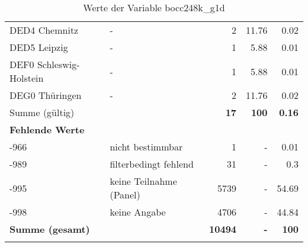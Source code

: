 \begin{longtable}{Xlrrr}
     \multicolumn{1}{X}{DED4 Chemnitz} &
     - &
     \num{2} &
     \num[round-mode=places,round-precision=2]{11.76} &
     \num[round-mode=places,round-precision=2]{0.02} \\

     \multicolumn{1}{X}{DED5 Leipzig} &
     - &
     \num{1} &
     \num[round-mode=places,round-precision=2]{5.88} &
     \num[round-mode=places,round-precision=2]{0.01} \\

     \multicolumn{1}{X}{DEF0 Schleswig-Holstein} &
     - &
     \num{1} &
     \num[round-mode=places,round-precision=2]{5.88} &
     \num[round-mode=places,round-precision=2]{0.01} \\

     \multicolumn{1}{X}{DEG0 Thüringen} &
     - &
     \num{2} &
     \num[round-mode=places,round-precision=2]{11.76} &
     \num[round-mode=places,round-precision=2]{0.02} \\
     \midrule
      \multicolumn{2}{l}{Summe (gültig)} & \textbf{\num{17}} &
      \textbf{\num{100}} &
         \textbf{\num[round-mode=places,round-precision=2]{0.16}} \\
     \multicolumn{5}{l}{\textbf{Fehlende Werte}}\\
       -966 & nicht bestimmbar & \num{1} & - & \num[round-mode=places,round-precision=2]{0.01} \\

       -989 & filterbedingt fehlend & \num{31} & - & \num[round-mode=places,round-precision=2]{0.3} \\

       -995 & keine Teilnahme (Panel) & \num{5739} & - & \num[round-mode=places,round-precision=2]{54.69} \\

       -998 & keine Angabe & \num{4706} & - & \num[round-mode=places,round-precision=2]{44.84} \\

     \midrule
     \multicolumn{2}{l}{\textbf{Summe (gesamt)}} & \textbf{\num{10494}} & \textbf{-} & \textbf{\num{100}} \\
     \bottomrule
     \caption{Werte der Variable bocc248k\_g1d}
     \end{longtable}
     
